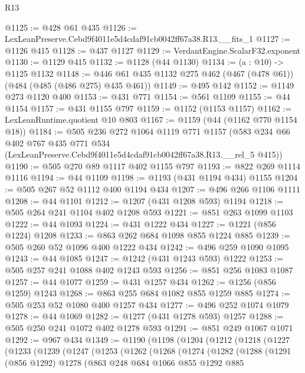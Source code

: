 \begin{lexlean}{R13}
\begin{coremodule}
@1125 := @428 @61 @435
@1126 := LexLeanPreserve.Cebd9f4011e5d4cdaf91cb0042ff67a38.R13.__fits_1
@1127 := @1126 @415
@1128 := @437 @1127
@1129 := VerdantEngine.ScalarF32.exponent
@1130 := @1129 @415
@1132 := @1128 (@44 @1130)
@1134 := (a : @10) -> @1125 @1132
@1148 := @446 @61 @435 @1132 @275 @462 (@467 (@478 @61)) (@484 (@485 (@486 @275) @435 @461))
@1149 := @495 @142
@1152 := @1149 @273 @1120 @400
@1153 := @431 @771
@1154 := @561 @1109
@1155 := @44 @1154
@1157 := @431 @1155 @797
@1159 := @1152 (@1153 @1157)
@1162 := LexLeanRuntime.quotient @10 @803
@1167 := @1159 (@44 (@1162 @770 @1154 @18))
@1184 := @505
    @236
    @272
    @1064
    @1119
    @771
    @1157
    (@583
      @234
      @66
      @402
      @767
      @435
      @771
      @534
      (LexLeanPreserve.Cebd9f4011e5d4cdaf91cb0042ff67a38.R13.__rel_5 @415))
@1190 := @505 @270 @89 @1117 @402 @1155 @797
@1193 := @822 @269 @1114 @1116
@1194 := @44 @1109
@1198 := @1193 (@431 @1194 @434) @1155
@1204 := @505 @267 @52 @1112 @400 @1194 @434
@1207 := @496 @266 @1106 @1111
@1208 := @44 @1101
@1212 := @1207 (@431 @1208 @593) @1194
@1218 := @505 @264 @241 @1104 @402 @1208 @593
@1221 := @851 @263 @1099 @1103
@1222 := @44 @1093
@1224 := @431 @1222 @434
@1227 := @1221 (@856 @1224) @1208
@1233 := @863 @262 @684 @1098 @855 @1224 @885
@1239 := @505 @260 @52 @1096 @400 @1222 @434
@1242 := @496 @259 @1090 @1095
@1243 := @44 @1085
@1247 := @1242 (@431 @1243 @593) @1222
@1253 := @505 @257 @241 @1088 @402 @1243 @593
@1256 := @851 @256 @1083 @1087
@1257 := @44 @1077
@1259 := @431 @1257 @434
@1262 := @1256 (@856 @1259) @1243
@1268 := @863 @255 @684 @1082 @855 @1259 @885
@1274 := @505 @253 @52 @1080 @400 @1257 @434
@1277 := @496 @252 @1074 @1079
@1278 := @44 @1069
@1282 := @1277 (@431 @1278 @593) @1257
@1288 := @505 @250 @241 @1072 @402 @1278 @593
@1291 := @851 @249 @1067 @1071
@1292 := @967 @434
@1349 := @1190
    (@1198
      (@1204
        (@1212
          (@1218
            (@1227
              (@1233
                (@1239
                  (@1247
                    (@1253
                      (@1262
                        (@1268
                          (@1274
                            (@1282
                              (@1288
                                (@1291
                                  (@856 @1292)
                                  @1278
                                  (@863
                                    @248
                                    @684
                                    @1066
                                    @855
                                    @1292
                                    @885

\end{coremodule}
\end{lexlean}
